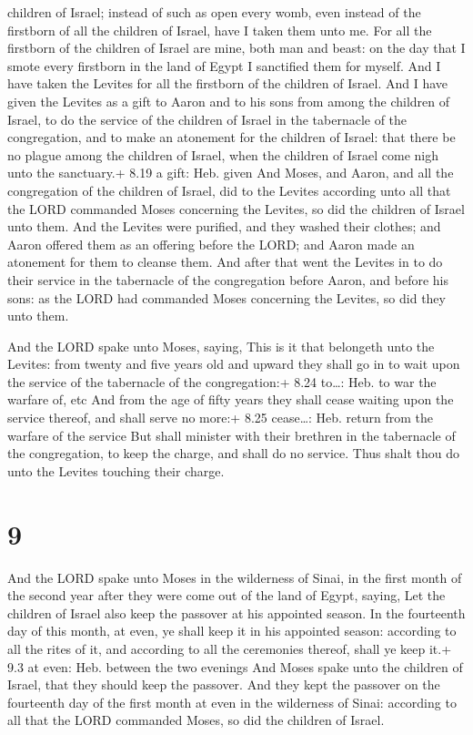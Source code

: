 children of Israel; instead of such as open every womb, even instead of
the firstborn of all the children of Israel, have I taken them unto me.
 For all the firstborn of the children of Israel are mine,
both man and beast: on the day that I smote every firstborn in the land
of Egypt I sanctified them for myself.  And I have taken
the Levites for all the firstborn of the children of Israel.
 And I have given the Levites as a gift to Aaron and to his
sons from among the children of Israel, to do the service of the
children of Israel in the tabernacle of the congregation, and to make an
atonement for the children of Israel: that there be no plague among the
children of Israel, when the children of Israel come nigh unto the
sanctuary.+ 8.19 a gift: Heb. given  And Moses, and Aaron,
and all the congregation of the children of Israel, did to the Levites
according unto all that the LORD commanded Moses concerning the Levites,
so did the children of Israel unto them.  And the Levites
were purified, and they washed their clothes; and Aaron offered them as
an offering before the LORD; and Aaron made an atonement for them to
cleanse them.  And after that went the Levites in to do
their service in the tabernacle of the congregation before Aaron, and
before his sons: as the LORD had commanded Moses concerning the Levites,
so did they unto them.

 And the LORD spake unto Moses, saying, 
This is it that belongeth unto the Levites: from twenty and five years
old and upward they shall go in to wait upon the service of the
tabernacle of the congregation:+ 8.24 to\ldots: Heb. to war the warfare
of, etc  And from the age of fifty years they shall cease
waiting upon the service thereof, and shall serve no more:+ 8.25
cease\ldots: Heb. return from the warfare of the service 
But shall minister with their brethren in the tabernacle of the
congregation, to keep the charge, and shall do no service. Thus shalt
thou do unto the Levites touching their charge.

\hypertarget{section-8}{%
\section{9}\label{section-8}}

 And the LORD spake unto Moses in the wilderness of Sinai,
in the first month of the second year after they were come out of the
land of Egypt, saying,  Let the children of Israel also keep
the passover at his appointed season.  In the fourteenth day
of this month, at even, ye shall keep it in his appointed season:
according to all the rites of it, and according to all the ceremonies
thereof, shall ye keep it.+ 9.3 at even: Heb. between the two evenings
 And Moses spake unto the children of Israel, that they
should keep the passover.  And they kept the passover on the
fourteenth day of the first month at even in the wilderness of Sinai:
according to all that the LORD commanded Moses, so did the children of
Israel.

